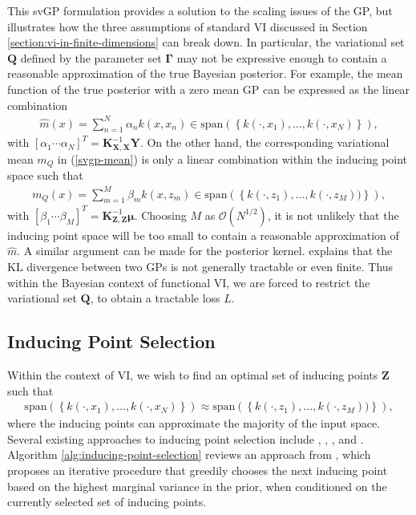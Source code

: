 \documentclass{article}
\numberwithin{equation}{section}
\begin{document}
This svGP formulation provides a solution to the scaling issues of the GP, but illustrates how the three assumptions of standard VI discussed in Section \ref{section:vi-in-finite-dimensions} can break down.
In particular, the variational set $\mathbf{Q}$ defined by the parameter set $\boldsymbol{\Gamma}$ may not be expressive enough to contain a reasonable approximation of the true Bayesian posterior.
For example, the mean function of the true posterior with a zero mean GP can be expressed as the linear combination
\begin{align}
    \hat{m}(x) = \sum_{n=1}^{N} \alpha_n k(x, x_n) \in \text{span} \left(\left\{k(\cdot, x_1), \dots, k(\cdot, x_N)\right\}\right),
\end{align}
with $\left[\alpha_1 \cdots \alpha_N\right]^T = \mathbf{K}_{\mathbf{X}, \mathbf{X}}^{-1}\mathbf{Y}$.
On the other hand, the corresponding variational mean $m_Q$ in (\ref{svgp-mean}) is only a linear combination within the inducing point space such that
\begin{align}
    m_Q(x) = \sum_{m=1}^{M} \beta_m k(x, z_m) \in \text{span}\left(\left\{k(\cdot, z_1), \dots, k(\cdot, z_M))\right\}\right),
\end{align}
with $\left[\beta_1 \cdots \beta_M\right]^T = \mathbf{K}_{\mathbf{Z}, \mathbf{Z}}^{-1}\boldsymbol{\mu}$.
Choosing $M$ as $\mathcal{O}(N^{1/2})$, it is not unlikely that the inducing point space will be too small to contain a reasonable approximation of $\hat{m}$.
A similar argument can be made for the posterior kernel.
\cite{burt2020understanding} explains that the KL divergence between two GPs is not generally tractable or even finite.
Thus within the Bayesian context of functional VI, we are forced to restrict the variational set $\boldsymbol{Q}$, to obtain a tractable loss $L$.

\subsection{Inducing Point Selection}\label{section:inducing-point-selection}
Within the context of VI, we wish to find an optimal set of inducing points $\mathbf{Z}$ such that
\begin{align}
    \text{span} \left(\left\{k(\cdot, x_1), \dots, k(\cdot, x_N)\right\}\right) \approx \text{span}\left(\left\{k(\cdot, z_1), \dots, k(\cdot, z_M))\right\}\right),
    \label{inducing-point-input-space}
\end{align}
where the inducing points can approximate the majority of the input space. 
Several existing approaches to inducing point selection include \cite{smola2000sparse}, \cite{hensman2015scalable}, \cite{li2016fast}, and \cite{alaoui2015fast}.
Algorithm \ref{alg:inducing-point-selection} reviews an approach from \cite{burt2020convergence}, which proposes an iterative procedure that greedily chooses the next inducing point based on the highest marginal variance in the prior, when conditioned on the currently selected set of inducing points.
\end{document}
